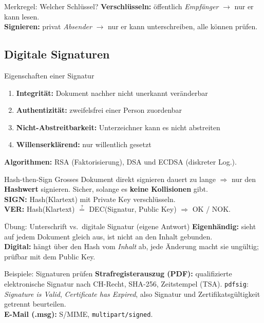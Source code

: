 \documentclass[a4paper, fontsize=7pt]{scrartcl}
\begin{document}
\begin{subbox}{Merkregel: Welcher Schlüssel?}
\textbf{Verschlüsseln:} öffentlich \emph{Empfänger} $\to$ nur er kann lesen.\\
\textbf{Signieren:} privat \emph{Absender} $\to$ nur er kann unterschreiben,
alle können prüfen.
\end{subbox}

\subsection{Digitale Signaturen}

\begin{mainbox}{Eigenschaften einer Signatur}
\begin{enumerate}
    \item \textbf{Integrität:} Dokument nachher nicht unerkannt veränderbar
    \item \textbf{Authentizität:} zweifelsfrei einer Person zuordenbar
    \item \textbf{Nicht-Abstreitbarkeit:} Unterzeichner kann es nicht abstreiten
    \item \textbf{Willenserklärend:} nur willentlich gesetzt
\end{enumerate}
\textbf{Algorithmen:} RSA (Faktorisierung), DSA und ECDSA (diskreter Log.).
\end{mainbox}

\begin{mainbox}{Hash-then-Sign}
Grosses Dokument direkt signieren dauert zu lange $\Rightarrow$ nur den
\textbf{Hashwert} signieren. Sicher, solange es \textbf{keine Kollisionen} gibt.\\
\textbf{SIGN:} Hash(Klartext) mit Private Key verschlüsseln.\\
\textbf{VER:} Hash(Klartext) $\stackrel{?}{=}$ DEC(Signatur, Public Key)
$\Rightarrow$ OK / NOK.
\end{mainbox}

\begin{subbox}{Übung: Unterschrift vs.\ digitale Signatur (eigene Antwort)}
\textbf{Eigenhändig:} sieht auf jedem Dokument gleich aus, ist nicht an den Inhalt
gebunden.\\
\textbf{Digital:} hängt über den Hash vom \emph{Inhalt} ab, jede Änderung macht sie
ungültig; prüfbar mit dem Public Key.
\end{subbox}

\begin{subbox}{Beispiele: Signaturen prüfen}
\textbf{Strafregisterauszug (PDF):} qualifizierte elektronische Signatur nach
CH-Recht, SHA-256, Zeitstempel (TSA).
\texttt{pdfsig}: \emph{Signature is Valid}, \emph{Certificate has Expired}, also
Signatur und Zertifikatsgültigkeit getrennt beurteilen.\\
\textbf{E-Mail (.msg):} S/MIME, \texttt{multipart/signed}.
\end{subbox}
\end{document}

